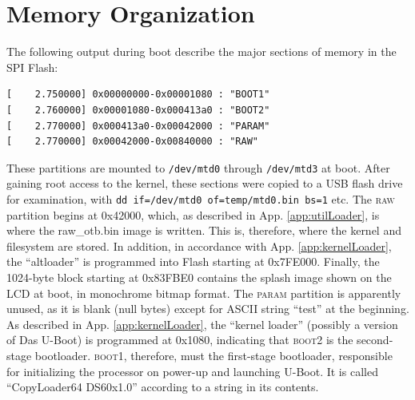 \documentclass[]{article}
\begin{document}
\section{Memory Organization}
\par The following output during boot describe the major sections of memory in the SPI Flash:
\begin{verbatim}
[    2.750000] 0x00000000-0x00001080 : "BOOT1"
[    2.760000] 0x00001080-0x000413a0 : "BOOT2"
[    2.770000] 0x000413a0-0x00042000 : "PARAM"
[    2.770000] 0x00042000-0x00840000 : "RAW"
\end{verbatim}
These partitions are mounted to \texttt{/dev/mtd0} through \texttt{/dev/mtd3} at boot. After gaining root access to the kernel, these sections were copied to a USB flash drive for examination, with \texttt{dd if=/dev/mtd0 of=temp/mtd0.bin bs=1} etc. The \textsc{raw} partition begins at 0x42000, which, as described in App. \ref{app:utilLoader}, is where the raw\_otb.bin image is written. This is, therefore, where the kernel and filesystem are stored. In addition, in accordance with App. \ref{app:kernelLoader}, the ``altloader'' is programmed into Flash starting at 0x7FE000. Finally, the 1024-byte block starting at 0x83FBE0 contains the splash image shown on the LCD at boot, in monochrome bitmap format. The \textsc{param} partition is apparently unused, as it is blank (null bytes) except for ASCII string ``test'' at the beginning. As described in App. \ref{app:kernelLoader}, the ``kernel loader'' (possibly a version of Das U-Boot) is programmed at 0x1080, indicating that \textsc{boot2} is the second-stage bootloader. \textsc{boot1}, therefore, must the first-stage bootloader, responsible for initializing the processor on power-up and launching U-Boot. It is called ``CopyLoader64 DS60x1.0'' according to a string in its contents.
\end{document}
